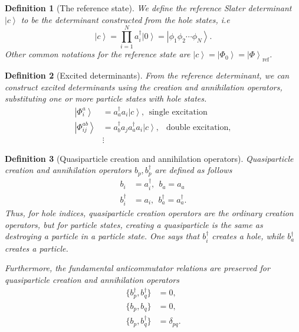 \documentclass[a4paper,10pt]{report}
\newcommand{\ket}[1]{\left| #1 \right\rangle} \newcommand{\element}[3]
\theoremstyle{definition}
\newtheorem{definition}{Definition}
\begin{document}
\begin{definition}[The reference state]
 We define the reference Slater determinant $\ket{c}$ to be the determinant constructed from the hole states, i.e 
 \begin{equation}
  \ket{c} = \prod_{i=1}^N a_i^\dagger \ket{0} = \ket{\phi_1 \phi_2 \cdots \phi_N}.
 \end{equation}
Other common notations for the reference state are $\ket{c} = \ket{\Phi_0} = \ket{\Phi}_\text{ref}$.
\end{definition}

\begin{definition}[Excited determinants]
 From the reference determinant, we can construct excited determinants using the creation and annihilation operators,
 substituting one or more particle states with hole states.
 \begin{align*}
  \ket{\Phi_i^a} &= a_a^\dagger a_i \ket{c}, \ \ \text{single excitation} \\
  \ket{\Phi_{ij}^{ab}} &= a_b^\dagger a_j a_a^\dagger a_i \ket{c}, \ \ \text{ double excitation}, \\
  &\vdots
 \end{align*}
\end{definition}

\begin{definition}[Quasiparticle creation and annihilation operators]
 Quasiparticle creation and annihilation operators $b_p,b_p^\dagger$ are defined as follows
 \begin{align}
  b_i &= a_i^\dagger, \ \ b_a = a_a \\
  b_i^\dagger &= a_i, \ \ b_a^\dagger = a_a^\dagger.
 \end{align}
 Thus, for hole indices, quasiparticle creation operators are the ordinary creation operators, but for
particle states, creating a quasiparticle is the same as destroying a particle in a particle state. One says
that $b_i^\dagger$ creates a hole, while $b_a^\dagger$ creates a particle.

Furthermore, the fundamental anticommutator relations are preserved for quasiparticle creation and annihilation operators
\begin{align}
 \{b_p^\dagger,b_q^\dagger \} &= 0, \\
 \{b_p,b_q \} &= 0, \\
 \{b_p,b_q^\dagger \} &= \delta_{pq}.
\end{align}
\end{definition}
\end{document}
